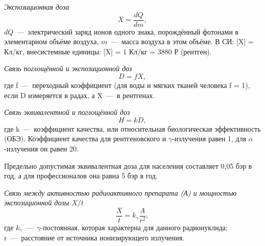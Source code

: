 \documentclass[a4paper, fontsize=14pt]{extreport}
\begin{document}
{\textit{Экспозиционная доза}
\begin{equation}
  X = \frac{dQ}{dm},
\end{equation}
$dQ$~---~электрический заряд ионов одного знака, порождённый фотонами в элементарном объёме воздуха, $m$~---~масса воздуха в этом объёме. В СИ: [X] = Кл/кг, внесистемные единицы: [X] = 1 Кл/кг = 3880 Р (рентген).

\textit{Связь поглощённой и экспозиционной доз}
\begin{equation} \label{absorbAndExposition}
  D = fX,
\end{equation}
где f~---~переходный коэффициент (для воды и мягких тканей человека f = 1), если D измеряется в радах, а X~---~в рентгенах.

\textit{Связь эквивалентной и поглощённой доз}
\begin{equation} \label{equivalentDoze}
  H = kD,
\end{equation}
где k~---~коэффициент качества, или относительная биологическая эффективность (ОБЭ). Коэффициент качества для рентгеновского и $\gamma$-излучения равен 1, для $\alpha$-излучения он равен 20.

Предельно допустимая эквивалентная доза для населения составляет 0,05 бэр в год, а для профессионалов она равна 5 бэр в год.

\textit{Связь между активностью радиоактивного препарата (А) и мощностью экспозиционной дозы $X/t$}
\begin{equation} \label{powerExposureDose}
  \frac{X}{t} = k_\gamma \frac{A}{r^2},
\end{equation}
где $k_\gamma$~---~$\gamma$-постоянная, которая характерна для данного радионуклида; r~---~расстояние от источника ионизирующего излучения.

}
\end{document}
